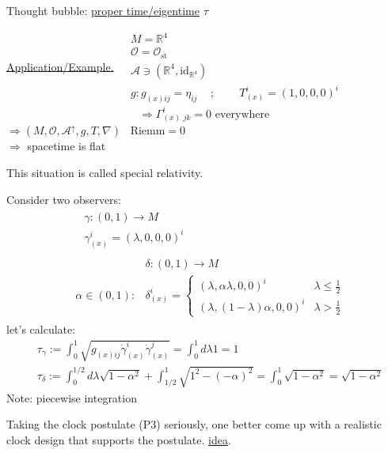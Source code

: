\documentclass[10pt]{amsart}
\begin{document}
\begin{multicols*}{2}
\begin{enumerate}
		Thought bubble: \underline{proper time/eigentime} $\tau$
		
		\underline{Application/Example.}
		$\begin{aligned}
		& M = \mathbb{R}^4 \\ 
		& \mathcal{O} = \mathcal{O}_{\text{st}} \\
		& \mathcal{A} \ni (\mathbb{R}^4, \text{id}_{\mathbb{R}^4} ) \\ 
		& g : g_{(x)ij} = \eta_{ij} \quad \, ; \quad \quad \, T_{(x)}^i =(1,0,0,0)^i
		\end{aligned}
		$
		\[
		\Longrightarrow \Gamma_{(x) \, \, jk }^i = 0 \text{ everywhere }
		\]
		$\Longrightarrow (M,\mathcal{O}, \mathcal{A}^{\uparrow},g,T,\nabla)$ \quad \, $\text{Riemm}=0$ \\
		$\Longrightarrow $ spacetime is flat
		
		This situation is called special relativity.
		
		Consider two observers: 
		\[
		\begin{aligned} & 
		\begin{aligned}
		& \gamma : (0,1) \to M \\ 
		& \gamma_{(x)}^i = (\lambda , 0 ,0  ,0 )^i \end{aligned} \\
		& 
		\begin{aligned}
		& \delta :(0,1) \to M \\
		\alpha \in (0,1) :   & \delta_{(x)}^i = \begin{cases} ( \lambda , \alpha \lambda , 0 , 0)^i & \lambda \leq \frac{1}{2} \\ 
		(\lambda, (1-\lambda)\alpha, 0,0)^i & \lambda > \frac{1}{2} \end{cases}
		\end{aligned}
		\end{aligned}
		\]
		let's calculate:
		\[
		\begin{aligned}
		& \tau_{\gamma}:= \int_0^1 \sqrt{ g_{(x)ij} \dot{\gamma}^i_{(x)} \dot{\gamma}^j_{(x)} } = \int_0^1 d\lambda 1 = 1 \\
		& \tau_{\delta} := \int_0^{1/2} d\lambda \sqrt{ 1- \alpha^2} + \int_{1/2}^1 \sqrt{ 1^2 - (-\alpha)^2 } = \int_0^1 \sqrt{ 1 - \alpha^2 } = \sqrt{ 1 - \alpha^2}
		\end{aligned}
		\]
		Note: piecewise integration
		
		Taking the clock postulate (P3) seriously, one better come up with a realistic clock design that supports the postulate. 
		\underline{idea}.
		

\end{enumerate}
\end{multicols*}
\end{document}
